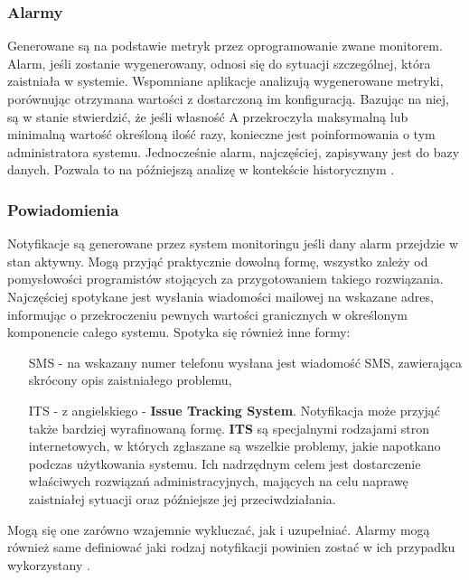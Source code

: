         \subsubsection{Alarmy}
        Generowane są na podstawie metryk przez oprogramowanie zwane monitorem. Alarm, jeśli zostanie wygenerowany, 
        odnosi się do sytuacji szczególnej, która zaistniała w systemie. Wspomniane aplikacje analizują wygenerowane metryki, 
        porównując otrzymana wartości z dostarczoną im konfiguracją. Bazując na niej, są w stanie stwierdzić, że jeśli
        własność A przekroczyła maksymalną lub minimalną wartość określoną ilość razy, konieczne jest poinformowania o tym
        administratora systemu. Jednocześnie alarm, najczęściej, zapisywany jest do bazy danych. Pozwala to na późniejszą analizę 
        w kontekście historycznym \cite{monitoring_and_alerting}. 
        
        \subsubsection{Powiadomienia}
        Notyfikacje są generowane przez system monitoringu jeśli dany alarm przejdzie w stan aktywny. Mogą przyjąć praktycznie
        dowolną formę, wszystko zależy od pomysłowości programistów stojących za przygotowaniem takiego rozwiązania.
        Najczęściej spotykane jest wysłania wiadomości mailowej na wskazane adres, informując o 
        przekroczeniu pewnych wartości granicznych w określonym komponencie całego systemu. Spotyka się również inne formy:
        \begin{itemize}
            \item[SMS] - na wskazany numer telefonu wysłana jest wiadomość SMS, zawierająca skrócony opis zaistniałego problemu,
            \item[ITS] - z angielskiego - \textbf{Issue Tracking System}. Notyfikacja może przyjąć także bardziej wyrafinowaną formę.
            \textbf{ITS} są specjalnymi rodzajami stron internetowych, w których zgłaszane są wszelkie problemy, jakie napotkano
            podczas użytkowania systemu. Ich nadrzędnym celem jest dostarczenie właściwych rozwiązań administracyjnych, mających
            na celu naprawę zaistniałej sytuacji oraz późniejsze jej przeciwdziałania.
        \end{itemize}
        Mogą się one zarówno wzajemnie wykluczać, jak i uzupełniać. Alarmy mogą również same definiować jaki rodzaj notyfikacji
        powinien zostać w ich przypadku wykorzystany \cite{monitoring_and_alerting}.
        
